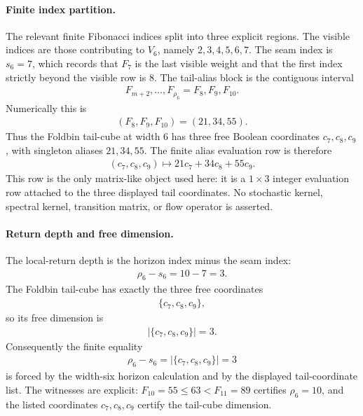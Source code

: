 \paragraph{Finite index partition.}
The relevant finite Fibonacci indices split into three explicit regions. The visible indices are those contributing to $V_6$, namely $2,3,4,5,6,7$. The seam index is $s_6=7$, which records that $F_7$ is the last visible weight and that the first index strictly beyond the visible row is $8$. The tail-alias block is the contiguous interval
$$
\begin{aligned}
F_{m+2},\ldots,F_{\rho_6}=F_8,F_9,F_{10}.
\end{aligned}
$$
Numerically this is
$$
\begin{aligned}
(F_8,F_9,F_{10})=(21,34,55).
\end{aligned}
$$
Thus the Foldbin tail-cube at width $6$ has three free Boolean coordinates $c_7,c_8,c_9$, with singleton aliases $21,34,55$. The finite alias evaluation row is therefore
$$
\begin{aligned}
(c_7,c_8,c_9)\longmapsto 21c_7+34c_8+55c_9.
\end{aligned}
$$
This row is the only matrix-like object used here: it is a $1\times 3$ integer evaluation row attached to the three displayed tail coordinates. No stochastic kernel, spectral kernel, transition matrix, or flow operator is asserted.

\paragraph{Return depth and free dimension.}
The local-return depth is the horizon index minus the seam index:
$$
\begin{aligned}
\rho_6-s_6=10-7=3.
\end{aligned}
$$
The Foldbin tail-cube has exactly the three free coordinates
$$
\begin{aligned}
\{c_7,c_8,c_9\},
\end{aligned}
$$
so its free dimension is
$$
\begin{aligned}
|\{c_7,c_8,c_9\}|=3.
\end{aligned}
$$
Consequently the finite equality
$$
\begin{aligned}
\rho_6-s_6=|\{c_7,c_8,c_9\}|=3
\end{aligned}
$$
is forced by the width-six horizon calculation and by the displayed tail-coordinate list. The witnesses are explicit: $F_{10}=55\leq 63<F_{11}=89$ certifies $\rho_6=10$, and the listed coordinates $c_7,c_8,c_9$ certify the tail-cube dimension.

